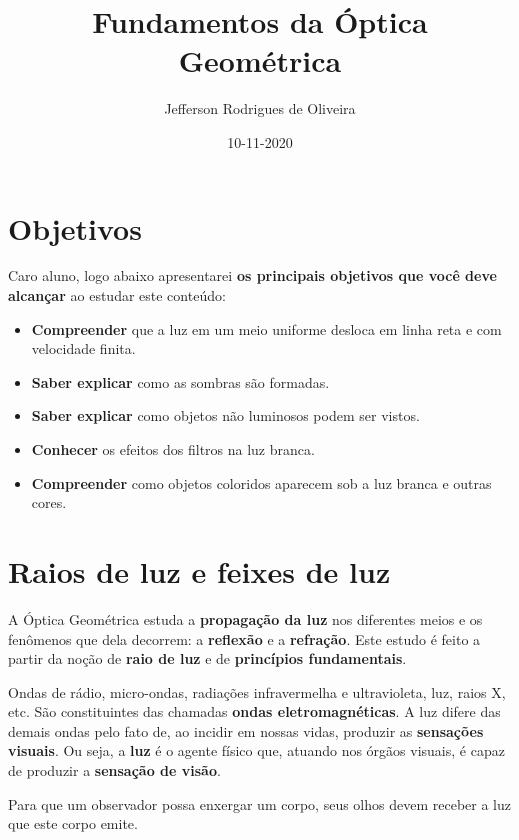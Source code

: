 \documentclass[11pt,twocolumn,oneside]{article}
\title{Fundamentos da Óptica Geométrica}
\author{Jefferson Rodrigues de Oliveira}
\date{10-11-2020}
\begin{document}
\maketitle
\tableofcontents
\hypertarget{x-objetivos}{\section{Objetivos}}
Caro aluno, logo abaixo apresentarei \textbf{os principais objetivos que você deve alcançar} ao estudar este conteúdo:


\begin{itemize}

\item \textbf{Compreender} que a luz em um meio uniforme desloca em linha reta e com velocidade finita.

\item \textbf{Saber explicar} como as sombras são formadas.

\item \textbf{Saber explicar} como objetos não luminosos podem ser vistos.

\item \textbf{Conhecer} os efeitos dos filtros na luz branca.

\item \textbf{Compreender} como objetos coloridos aparecem sob a luz branca e outras cores.

\end{itemize}


\hypertarget{x-raios-de-luz-e-feixes-de-luz}{\section{Raios de luz e feixes de luz}}
A Óptica Geométrica estuda a \textbf{propagação da luz} nos diferentes meios e os fenômenos que dela decorrem: a \textbf{reflexão} e a \textbf{refração}. Este estudo é feito a partir da noção de \textbf{raio de luz} e de \textbf{princípios fundamentais}.


Ondas de rádio, micro-ondas, radiações infravermelha e ultravioleta, luz, raios X, etc. São constituintes das chamadas \textbf{ondas eletromagnéticas}. A luz difere das demais ondas pelo fato de, ao incidir em nossas vidas, produzir as \textbf{sensações visuais}. Ou seja, a \textbf{luz} é o agente físico que, atuando nos órgãos visuais, é capaz de produzir a \textbf{sensação de visão}.


Para que um observador possa enxergar um corpo, seus olhos devem receber a luz que este corpo emite.
\end{document}
